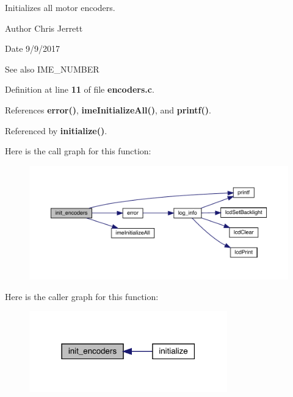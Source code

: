 Initializes all motor encoders. 

\begin{DoxyAuthor}{Author}
Chris Jerrett 
\end{DoxyAuthor}
\begin{DoxyDate}{Date}
9/9/2017 
\end{DoxyDate}
\begin{DoxySeeAlso}{See also}
I\+M\+E\+\_\+\+N\+U\+M\+B\+ER 
\end{DoxySeeAlso}


Definition at line \textbf{ 11} of file \textbf{ encoders.\+c}.



References \textbf{ error()}, \textbf{ ime\+Initialize\+All()}, and \textbf{ printf()}.



Referenced by \textbf{ initialize()}.


Here is the call graph for this function\+:
\nopagebreak
\begin{figure}[H]
\begin{center}
\leavevmode
\includegraphics[width=350pt]{encoders_8h_aa6ec1ca17e907babd52803ecba451cd3_cgraph}
\end{center}
\end{figure}
Here is the caller graph for this function\+:
\nopagebreak
\begin{figure}[H]
\begin{center}
\leavevmode
\includegraphics[width=243pt]{encoders_8h_aa6ec1ca17e907babd52803ecba451cd3_icgraph}
\end{center}
\end{figure}
